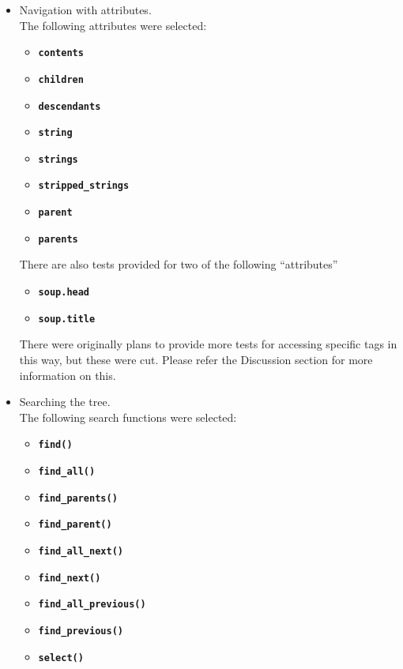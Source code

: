 \documentclass[10pt]{article}
\newcommand{\tbt}[1]{\texttt{\textbf{#1}}}
\begin{document}
\begin{itemize}
  \item Navigation with attributes. \\
  The following attributes were selected: 
  \begin{itemize}
   \setlength\itemsep{-0.05em}
   \item \tbt{contents}
   \item \tbt{children}
   \item \tbt{descendants} 
   \item \tbt{string}
   \item \tbt{strings}
   \item \tbt{stripped\_strings}
   \item \tbt{parent}
   \item \tbt{parents}
  \end{itemize} 
  There are also tests provided for two of the following ``attributes''
  \begin{itemize}
  \setlength\itemsep{-0.05em}
   \item \tbt{soup.head}
   \item \tbt{soup.title} 
  \end{itemize}
  There were originally plans to provide more tests for accessing specific tags in this way, but these were cut. Please refer the  Discussion section for more information on this.

  \item Searching the tree. \\
  The following search functions were selected: 
  \begin{itemize}
  \setlength\itemsep{-0.05em}
    \item \tbt{find()}
    \item \tbt{find\_all()}
    \item \tbt{find\_parents()}
    \item \tbt{find\_parent()}
    \item \tbt{find\_all\_next()}
    \item \tbt{find\_next()}
    \item \tbt{find\_all\_previous()}
    \item \tbt{find\_previous()}
    \item \tbt{select()}
  \end{itemize}


\end{itemize}
\end{document}
